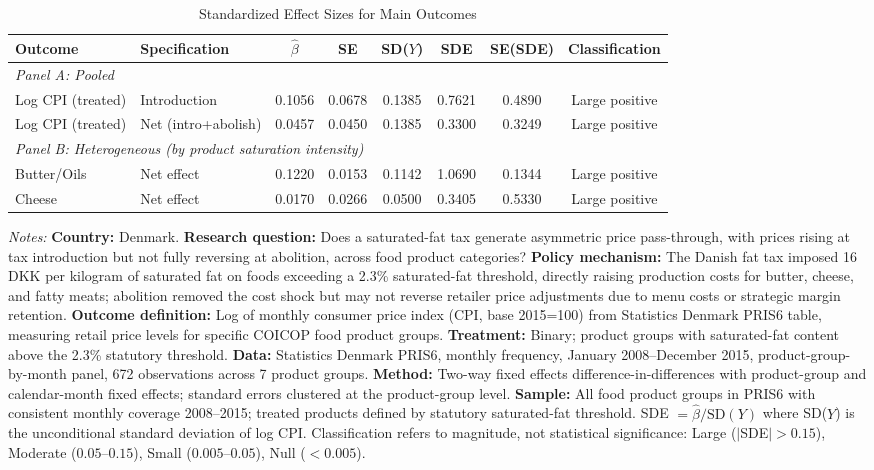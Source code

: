 \begin{table}[H]
\centering
\caption{Standardized Effect Sizes for Main Outcomes}
\label{tab:sde}
\footnotesize
\begin{minipage}{\textwidth}
\begin{threeparttable}
\begin{tabular*}{\textwidth}{@{\extracolsep{\fill}}llcccccc}
\toprule
Outcome & Specification & $\hat{\beta}$ & SE & SD($Y$) & SDE & SE(SDE) & Classification \\
\midrule
\multicolumn{8}{l}{\textit{Panel A: Pooled}} \\
Log CPI (treated) & Introduction & 0.1056 & 0.0678 & 0.1385 & 0.7621 & 0.4890 & Large positive \\
Log CPI (treated) & Net (intro+abolish) & 0.0457 & 0.0450 & 0.1385 & 0.3300 & 0.3249 & Large positive \\
\midrule
\multicolumn{8}{l}{\textit{Panel B: Heterogeneous (by product saturation intensity)}} \\
Butter/Oils & Net effect & 0.1220 & 0.0153 & 0.1142 & 1.0690 & 0.1344 & Large positive \\
Cheese & Net effect & 0.0170 & 0.0266 & 0.0500 & 0.3405 & 0.5330 & Large positive \\
\bottomrule
\end{tabular*}
\begin{tablenotes}[flushleft]
\scriptsize
\item \textit{Notes:} \textbf{Country:} Denmark. \textbf{Research question:} Does a saturated-fat tax generate asymmetric price pass-through, with prices rising at tax introduction but not fully reversing at abolition, across food product categories? \textbf{Policy mechanism:} The Danish fat tax imposed 16 DKK per kilogram of saturated fat on foods exceeding a 2.3\% saturated-fat threshold, directly raising production costs for butter, cheese, and fatty meats; abolition removed the cost shock but may not reverse retailer price adjustments due to menu costs or strategic margin retention. \textbf{Outcome definition:} Log of monthly consumer price index (CPI, base 2015=100) from Statistics Denmark PRIS6 table, measuring retail price levels for specific COICOP food product groups. \textbf{Treatment:} Binary; product groups with saturated-fat content above the 2.3\% statutory threshold. \textbf{Data:} Statistics Denmark PRIS6, monthly frequency, January 2008--December 2015, product-group-by-month panel, 672 observations across 7 product groups. \textbf{Method:} Two-way fixed effects difference-in-differences with product-group and calendar-month fixed effects; standard errors clustered at the product-group level. \textbf{Sample:} All food product groups in PRIS6 with consistent monthly coverage 2008--2015; treated products defined by statutory saturated-fat threshold. SDE $= \hat{\beta} / \text{SD}(Y)$ where SD($Y$) is the unconditional standard deviation of log CPI. Classification refers to magnitude, not statistical significance: Large ($|$SDE$| > 0.15$), Moderate ($0.05$--$0.15$), Small ($0.005$--$0.05$), Null ($< 0.005$).

\end{tablenotes}
\end{threeparttable}
\end{minipage}
\end{table}
